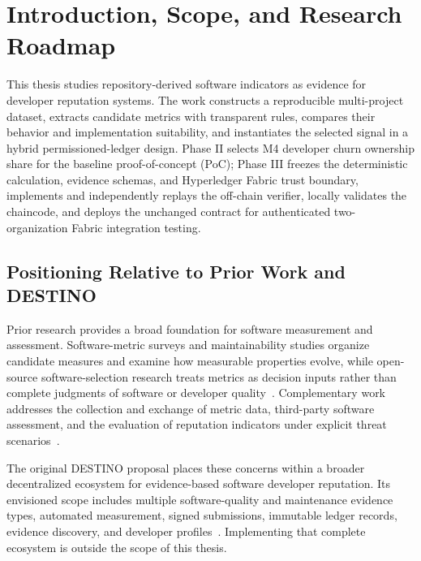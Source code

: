 \section{Introduction, Scope, and Research Roadmap}
\label{sec:intro_scope}

This thesis studies repository-derived software indicators as evidence for developer reputation systems.
The work constructs a reproducible multi-project dataset, extracts candidate metrics with transparent rules,
compares their behavior and implementation suitability, and instantiates the selected signal in a hybrid
permissioned-ledger design. Phase II selects M4 developer churn ownership share for the baseline proof-of-concept
(PoC); Phase III freezes the deterministic calculation, evidence schemas, and Hyperledger Fabric trust boundary,
implements and independently replays the off-chain verifier, locally validates the chaincode, and deploys the unchanged
contract for authenticated two-organization Fabric integration testing.

\subsection*{Positioning Relative to Prior Work and DESTINO}

Prior research provides a broad foundation for software measurement and assessment. Software-metric surveys and
maintainability studies organize candidate measures and examine how measurable properties evolve, while open-source
software-selection research treats metrics as decision inputs rather than complete judgments of software or developer
quality~\cite{timoteo_software_metrics_survey,kumar2012maintainability,kapllani2020maintainability,
syedmohamad2026maintainability,li2022ossselection}. Complementary work addresses the collection and exchange of metric
data, third-party software assessment, and the evaluation of reputation indicators under explicit threat
scenarios~\cite{khomyakov2019metricssharing,remencius2016thirdparty,koutrouli2015reputation,schlosser2004reputation}.

The original DESTINO proposal places these concerns within a broader decentralized ecosystem for evidence-based software
developer reputation. Its envisioned scope includes multiple software-quality and maintenance evidence types, automated
measurement, signed submissions, immutable ledger records, evidence discovery, and developer profiles~\cite{destinoProposal}.
Implementing that complete ecosystem is outside the scope of this thesis.

